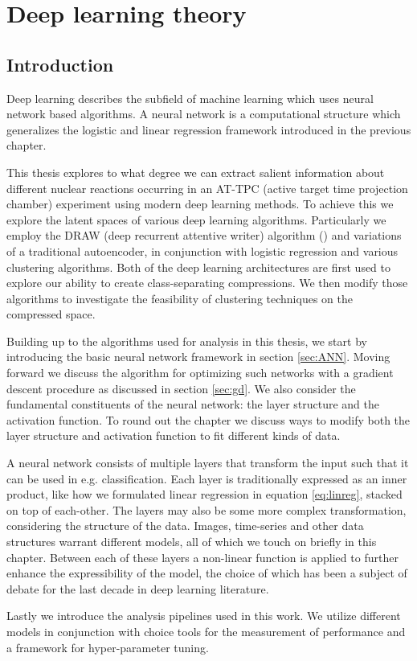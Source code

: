 \chapter{Deep learning theory}\label{ch:ml}
\section{Introduction}

Deep learning describes the subfield of machine learning which uses neural network based algorithms. A neural network is a computational structure which generalizes the logistic and linear regression framework introduced in the previous chapter.


This thesis explores to what degree we can extract salient information about different nuclear reactions occurring in an AT-TPC (active target time projection chamber) experiment using modern deep learning methods. To achieve this we explore the latent spaces of various deep learning algorithms. Particularly we employ the DRAW (deep recurrent attentive writer) algorithm (\cite{Gregor2015}) and variations of a traditional autoencoder, in conjunction with logistic regression and various clustering algorithms. Both of the deep learning architectures are first used to explore our ability to create class-separating compressions. We then modify those algorithms to investigate the feasibility of clustering techniques on the compressed space. 

Building up to the algorithms used for analysis in this thesis, we start by introducing the basic neural network framework in section \ref{sec:ANN}. Moving forward we discuss the algorithm for optimizing such networks with a gradient descent procedure as discussed in section \ref{sec:gd}. We also consider the fundamental constituents of the neural network: the layer structure and the activation function. To round out the chapter we discuss ways to modify both the layer structure and activation function to fit different kinds of data.

A neural network consists of multiple layers that transform the input such that it can be used in e.g. classification. Each layer is traditionally expressed as an inner product, like how we formulated linear regression in equation \ref{eq:linreg}, stacked on top of each-other. The layers may also be some more complex transformation, considering the structure of the data. Images, time-series and other data structures warrant different models, all of which we touch on briefly in this chapter. Between each of these layers a non-linear function is applied to further enhance the expressibility of the model, the choice of which has been a subject of debate for the last decade in deep learning literature.

Lastly we introduce the analysis pipelines used in this work. We utilize different models in conjunction with choice tools for the measurement of performance and a framework for hyper-parameter tuning. 